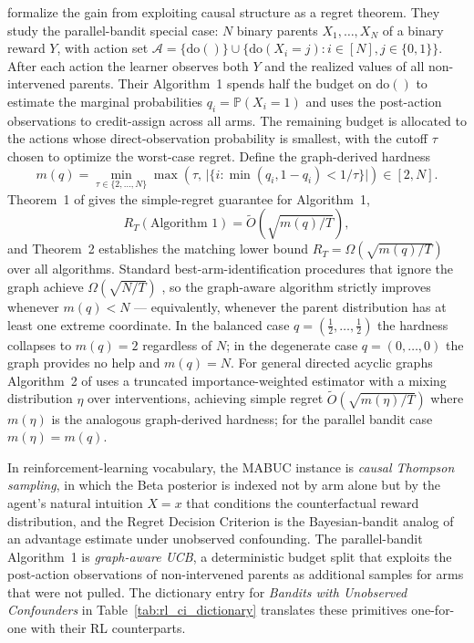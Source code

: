 \citet{lattimore2016causal} formalize the gain from exploiting causal structure as a regret theorem. They study the parallel-bandit special case: $N$ binary parents $X_1, \ldots, X_N$ of a binary reward $Y$, with action set $\mathcal{A} = \{\mathrm{do}()\} \cup \{\mathrm{do}(X_i = j) : i \in [N], j \in \{0,1\}\}$. After each action the learner observes both $Y$ and the realized values of all non-intervened parents. Their Algorithm~1 spends half the budget on $\mathrm{do}()$ to estimate the marginal probabilities $q_i = \mathbb{P}(X_i = 1)$ and uses the post-action observations to credit-assign across all arms. The remaining budget is allocated to the actions whose direct-observation probability is smallest, with the cutoff $\tau$ chosen to optimize the worst-case regret. Define the graph-derived hardness
\begin{equation}
m(q) = \min_{\tau \in \{2, \ldots, N\}} \max\!\left(\tau,\, \bigl|\{i : \min(q_i, 1 - q_i) < 1/\tau\}\bigr|\right) \in [2, N].
\label{eq:lattimore_m}
\end{equation}
Theorem~1 of \citet{lattimore2016causal} gives the simple-regret guarantee for Algorithm~1,
\begin{equation}
R_T(\text{Algorithm 1}) = \tilde O\!\left(\sqrt{m(q)/T}\right),
\label{eq:lattimore_regret}
\end{equation}
and Theorem~2 establishes the matching lower bound $R_T = \Omega(\sqrt{m(q)/T})$ over all algorithms. Standard best-arm-identification procedures that ignore the graph achieve $\Omega(\sqrt{N/T})$ \citep[Theorem~4]{lattimore2016causal}, so the graph-aware algorithm strictly improves whenever $m(q) < N$ — equivalently, whenever the parent distribution has at least one extreme coordinate. In the balanced case $q = (\tfrac{1}{2}, \ldots, \tfrac{1}{2})$ the hardness collapses to $m(q) = 2$ regardless of $N$; in the degenerate case $q = (0, \ldots, 0)$ the graph provides no help and $m(q) = N$. For general directed acyclic graphs Algorithm~2 of \citet{lattimore2016causal} uses a truncated importance-weighted estimator with a mixing distribution $\eta$ over interventions, achieving simple regret $\tilde O(\sqrt{m(\eta)/T})$ where $m(\eta)$ is the analogous graph-derived hardness; for the parallel bandit case $m(\eta) = m(q)$.

In reinforcement-learning vocabulary, the MABUC instance is \emph{causal Thompson sampling}, in which the Beta posterior is indexed not by arm alone but by the agent's natural intuition $X = x$ that conditions the counterfactual reward distribution, and the Regret Decision Criterion is the Bayesian-bandit analog of an advantage estimate under unobserved confounding. The parallel-bandit Algorithm~1 is \emph{graph-aware UCB}, a deterministic budget split that exploits the post-action observations of non-intervened parents as additional samples for arms that were not pulled. The dictionary entry for \emph{Bandits with Unobserved Confounders} in Table~\ref{tab:rl_ci_dictionary} translates these primitives one-for-one with their RL counterparts.

